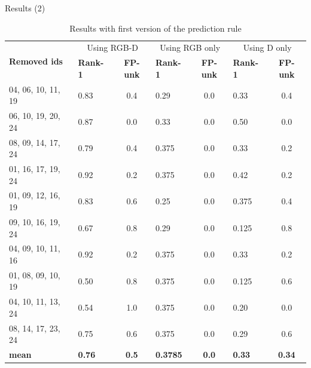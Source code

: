 \documentclass{beamer}
\begin{document}
\begin{frame}{Results (2)}
	\scriptsize
	\begin{table}[]
		\centering
		\caption{Results with first version of the prediction rule}
		\begin{tabular}{|l|l|c|l|c|l|c|}
			\hline
			\multirow{2}{*}{\bf Removed ids} & \multicolumn{2}{c|}{Using RGB-D} &\multicolumn{2}{c|}{Using RGB only} &\multicolumn{2}{c|}{Using D only} \\ \cline{2-7}
							 & \bf Rank-1 & \bf FP-unk          & \bf Rank-1 & \bf FP-unk            & \bf Rank-1 & \bf FP-unk  \\ \hline
			04, 06, 10, 11, 19               & 0.83	      & 0.4                 & 0.29       & 0.0                         & 0.33       & 0.4\\ \hline
			06, 10, 19, 20, 24               & 0.87	      & 0.0                 & 0.33       & 0.0                         & 0.50       & 0.0\\ \hline
			08, 09, 14, 17, 24               & 0.79	      & 0.4                 & 0.375      & 0.0                         & 0.33       & 0.2\\ \hline
			01, 16, 17, 19, 24               & 0.92	      & 0.2                 & 0.375      & 0.0                         & 0.42       & 0.2\\ \hline
			01, 09, 12, 16, 19               & 0.83	      & 0.6                 & 0.25       & 0.0                         & 0.375      & 0.4\\ \hline
			09, 10, 16, 19, 24               & 0.67	      & 0.8                 & 0.29       & 0.0                         & 0.125      & 0.8\\ \hline
			04, 09, 10, 11, 16               & 0.92	      & 0.2                 & 0.375      & 0.0                         & 0.33       & 0.2\\ \hline
			01, 08, 09, 10, 19               & 0.50	      & 0.8                 & 0.375      & 0.0                         & 0.125      & 0.6\\ \hline
			04, 10, 11, 13, 24               & 0.54	      & 1.0                 & 0.375      & 0.0                         & 0.20       & 0.0\\ \hline
			08, 14, 17, 23, 24               & 0.75	      & 0.6                 & 0.375      & 0.0                         & 0.29       & 0.6\\ \hline
			\bf mean                         & \bf 0.76   & \bf 0.5             & \bf 0.3785 & \bf 0.0                     & \bf 0.33   & \bf 0.34\\ \hline
		\end{tabular}
	\end{table}


\end{frame}
\end{document}

